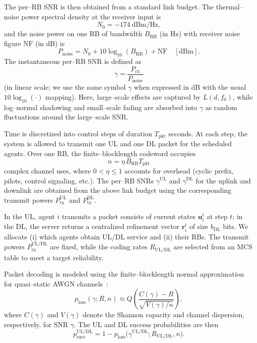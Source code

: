 \documentclass[conference]{IEEEtran}
\begin{document}
The per–RB SNR is then obtained from a standard link budget.
The thermal–noise power spectral density at the receiver input is
\[
  N_0 = -174~\mathrm{dBm/Hz},
\]
and the noise power on one RB of bandwidth $B_{\mathrm{RB}}$ (in Hz) with
receiver noise figure $\mathrm{NF}$ (in dB) is
\[
  P_{\mathrm{noise}} = N_0 + 10\log_{10}(B_{\mathrm{RB}}) + \mathrm{NF}
  \quad [\mathrm{dBm}].
\]
The instantaneous per–RB SNR is defined as
\[
  \gamma = \frac{P_{\mathrm{rx}}}{P_{\mathrm{noise}}}
\]
(in linear scale; we use the same symbol $\gamma$ when expressed in dB
with the usual $10\log_{10}(\cdot)$ mapping).
Here, large–scale effects are captured by $L(d,f_0)$, while
log–normal shadowing and small–scale fading are absorbed into $\gamma$
as random fluctuations around the large–scale SNR.

Time is discretized into control steps of duration $T_{\mathrm{pkt}}$ seconds.
At each step, the system is allowed to transmit one UL and one DL packet for
the scheduled agents. Over one RB, the finite–blocklength codeword
occupies
\[
  n = \eta\,B_{\mathrm{RB}} T_{\mathrm{pkt}}
\]
complex channel uses, where $0 < \eta \le 1$ accounts for overhead
(cyclic prefix, pilots, control signaling, etc.). The per–RB SNRs
$\gamma^{\mathrm{UL}}$ and $\gamma^{\mathrm{DL}}$ for the uplink
and downlink are obtained from the above link budget using the
corresponding transmit powers $P_{\mathrm{tx}}^{\mathrm{UL}}$ and
$P_{\mathrm{tx}}^{\mathrm{DL}}$.

In the UL, agent $i$ transmits a packet consists of current states $\mathbf{u}_i^t$
at step $t$; in the DL, the server returns a centralized refinement
vector $\mathbf{r}_i^t$ of size $b_{\mathrm{DL}}$ bits.
We allocate (i) which agents obtain UL/DL service and (ii) their RBs.
The transmit powers $P_{\mathrm{tx}}^{\mathrm{UL/DL}}$ are fixed,
while the coding rates $R_{\mathrm{UL/DL}}$ are selected from an MCS
table to meet a target reliability.

Packet decoding is modeled using the finite–blocklength normal
approximation for quasi–static AWGN channels~\cite{11016913,9134368}:
\begin{equation}
  p_{\mathrm{loss}}(\gamma;R,n)
  \approx
  Q\!\left(\frac{C(\gamma)-R}{\sqrt{V(\gamma)/n}}\right),
\end{equation}
where $C(\gamma)$ and $V(\gamma)$ denote the Shannon capacity and
channel dispersion, respectively, for SNR $\gamma$.
The UL and DL success probabilities are then
\begin{equation}
  p_{\mathrm{succ}}^{\mathrm{UL/DL}}
  = 1 - p_{\mathrm{loss}}\big(\gamma^{\mathrm{UL/DL}}; R_{\mathrm{UL/DL}}, n\big).
\end{equation}
\end{document}
